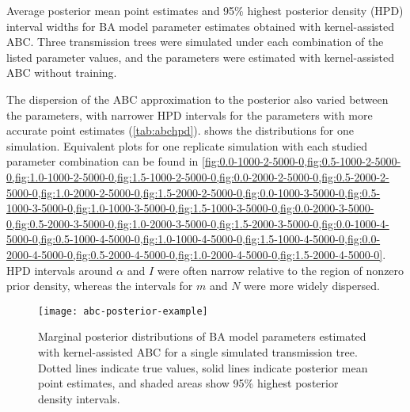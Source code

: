 \begin{table*}[ht]
  \centering
  
  \caption[
      Average posterior mean point estimates and 95\% highest posterior density
      (HPD) interval widths for BA model parameter estimates obtained with
      kernel-assisted ABC.
  ]{
      Average posterior mean point estimates and 95\% highest posterior density
      (HPD) interval widths for BA model parameter estimates obtained with
      kernel-assisted ABC. Three transmission trees were simulated under each
      combination of the listed parameter values, and the parameters were
      estimated with kernel-assisted ABC without training.
  }
  \label{tab:abchpd}
\end{table*}



The dispersion of the ABC approximation to the posterior also varied between
the parameters, with narrower HPD intervals for the parameters with more
accurate point estimates (\cref{tab:abchpd}).  shows
the distributions for one simulation. Equivalent plots for one replicate
simulation with each studied parameter combination can be found in
\cref{fig:0.0-1000-2-5000-0,fig:0.5-1000-2-5000-0,fig:1.0-1000-2-5000-0,fig:1.5-1000-2-5000-0,fig:0.0-2000-2-5000-0,fig:0.5-2000-2-5000-0,fig:1.0-2000-2-5000-0,fig:1.5-2000-2-5000-0,fig:0.0-1000-3-5000-0,fig:0.5-1000-3-5000-0,fig:1.0-1000-3-5000-0,fig:1.5-1000-3-5000-0,fig:0.0-2000-3-5000-0,fig:0.5-2000-3-5000-0,fig:1.0-2000-3-5000-0,fig:1.5-2000-3-5000-0,fig:0.0-1000-4-5000-0,fig:0.5-1000-4-5000-0,fig:1.0-1000-4-5000-0,fig:1.5-1000-4-5000-0,fig:0.0-2000-4-5000-0,fig:0.5-2000-4-5000-0,fig:1.0-2000-4-5000-0,fig:1.5-2000-4-5000-0}. HPD intervals around $\alpha$ and $I$ were often narrow
relative to the region of nonzero prior density, whereas the intervals for $m$
and $N$ were more widely dispersed.

\begin{figure}[ht]
    \centering
    \texttt{[image: abc-posterior-example]}
  \vspace{6pt}
  \caption[
    Marginal posterior distributions of BA model parameters estimated
    with kernel-assisted ABC for a single simulated transmission tree.
  ]{
    Marginal posterior distributions of BA model parameters estimated
    with kernel-assisted ABC for a single simulated transmission tree. Dotted
    lines indicate true values, solid lines indicate posterior mean point
    estimates, and shaded areas show 95\% highest posterior density intervals.
  }
  \label{fig:abcex}
\end{figure}



